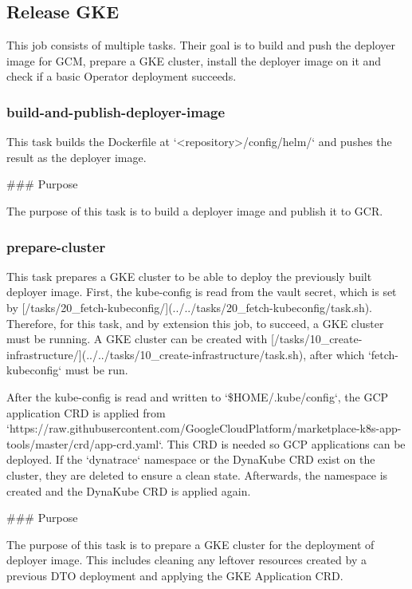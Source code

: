 \subsection{Release GKE}\label{subsec:release-gke}

This job consists of multiple tasks.
Their goal is to build and push the deployer image for GCM, prepare a GKE cluster, install the deployer image on it and check if a basic Operator deployment succeeds.

\subsubsection{build-and-publish-deployer-image}\label{subsubsec:build-and-publish-deployer-image}

This task builds the Dockerfile at `<repository>/config/helm/` and pushes the result as the deployer image.

### Purpose

The purpose of this task is to build a deployer image and publish it to GCR.

\subsubsection{prepare-cluster}\label{subsubsec:prepare-cluster}

This task prepares a GKE cluster to be able to deploy the previously built deployer image.
First, the kube-config is read from the vault secret, which is set by [/tasks/20_fetch-kubeconfig/](../../tasks/20_fetch-kubeconfig/task.sh).
Therefore, for this task, and by extension this job, to succeed, a GKE cluster must be running.
A GKE cluster can be created with [/tasks/10_create-infrastructure/](../../tasks/10_create-infrastructure/task.sh), after which `fetch-kubeconfig` must be run.

After the kube-config is read and written to `\${HOME}/.kube/config`, the GCP application CRD is applied from `https://raw.githubusercontent.com/GoogleCloudPlatform/marketplace-k8s-app-tools/master/crd/app-crd.yaml`.
This CRD is needed so GCP applications can be deployed.
If the `dynatrace` namespace or the DynaKube CRD exist on the cluster, they are deleted to ensure a clean state.
Afterwards, the namespace is created and the DynaKube CRD is applied again.

### Purpose

The purpose of this task is to prepare a GKE cluster for the deployment of deployer image.
This includes cleaning any leftover resources created by a previous DTO deployment and applying the GKE Application CRD.

